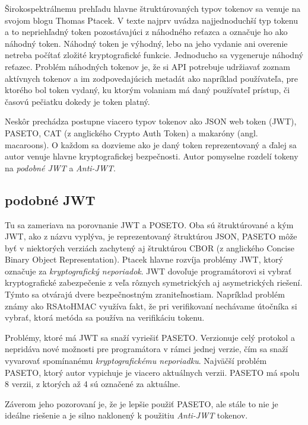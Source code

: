 Širokospektrálnemu prehľadu hlavne štruktúrovaných typov tokenov sa venuje na svojom blogu \cite{tokens_comparison} Thomas Ptacek. V texte najprv uvádza najjednoduchší typ tokenu a to nepriehľadný token pozostávajúci z náhodného reťazca a označuje ho ako náhodný token. Náhodný token je výhodný, lebo na jeho vydanie ani overenie netreba počítať zložité kryptografické funkcie. Jednoducho sa vygeneruje náhodný reťazec. Problém náhodných tokenov je, že si API potrebuje udržiavať zoznam aktívnych tokenov a im zodpovedajúcich metadát ako napríklad používateľa, pre ktorého bol token vydaný, ku ktorým volaniam má daný používateľ prístup, či časovú pečiatku dokedy je token platný.

Neskôr prechádza postupne viacero typov tokenov ako JSON web token (JWT), PASETO, CAT (z anglického Crypto Auth Token) a makaróny (angl. macaroons). O každom sa dozvieme ako je daný token reprezentovaný a ďalej sa autor venuje hlavne kryptografickej bezpečnosti. Autor pomyselne rozdelí tokeny na \textit{podobné JWT} a \textit{Anti-JWT}.

\subsection{podobné JWT}

Tu sa zameriava na porovnanie JWT a POSETO. Oba sú štruktúrované a kým JWT, ako z názvu vyplýva, je reprezentovaný štruktúrou JSON, PASETO môže byť v niektorých verziách zachytený aj štruktúrou CBOR (z anglického Concise Binary Object Representation). Ptacek hlavne rozvíja problémy JWT, ktorý označuje za \textit{kryptografický neporiadok}. JWT dovoľuje programátorovi si vybrať kryptografické zabezpečenie z veľa rôznych symetrických aj asymetrických riešení. Týmto sa otvárajú dvere bezpečnostným zraniteľnostiam. Napríklad problém známy ako RSAtoHMAC \cite{vulnerabilities} využíva fakt, že pri verifikovaní nechávame útočníka si vybrať, ktorá metóda sa používa na verifikáciu tokenu.

Problémy, ktoré má JWT sa snaží vyriešiť PASETO. Verzionuje celý protokol a nepridáva nové možnosti pre programátora v rámci jednej verzie, čím sa snaží vyvarovať spomínanému \textit{kryptografickému neporiadku}. Najväčší problém PASETO, ktorý autor vypichuje je viacero aktuálnych verzii. PASETO má spolu 8 verzii, z ktorých až 4 sú označené za aktuálne.

Záverom jeho pozorovaní je, že je lepšie použiť PASETO, ale stále to nie je ideálne riešenie a je silno naklonený k použitiu \textit{Anti-JWT} tokenov.

